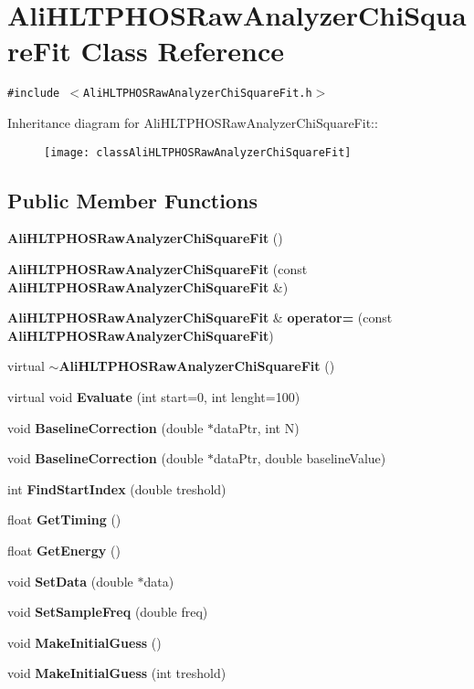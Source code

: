 \section{Ali\-HLTPHOSRaw\-Analyzer\-Chi\-Square\-Fit Class Reference}
\label{classAliHLTPHOSRawAnalyzerChiSquareFit}
{\tt \#include $<$Ali\-HLTPHOSRaw\-Analyzer\-Chi\-Square\-Fit.h$>$}

Inheritance diagram for Ali\-HLTPHOSRaw\-Analyzer\-Chi\-Square\-Fit::\begin{figure}[H]
\begin{center}
\leavevmode
\texttt{[image: classAliHLTPHOSRawAnalyzerChiSquareFit]}
\end{center}
\end{figure}
\subsection*{Public Member Functions}
\begin{CompactItemize}
\item 
{\bf Ali\-HLTPHOSRaw\-Analyzer\-Chi\-Square\-Fit} ()
\item 
{\bf Ali\-HLTPHOSRaw\-Analyzer\-Chi\-Square\-Fit} (const {\bf Ali\-HLTPHOSRaw\-Analyzer\-Chi\-Square\-Fit} \&)
\item 
{\bf Ali\-HLTPHOSRaw\-Analyzer\-Chi\-Square\-Fit} \& {\bf operator=} (const {\bf Ali\-HLTPHOSRaw\-Analyzer\-Chi\-Square\-Fit})
\item 
virtual {\bf $\sim$Ali\-HLTPHOSRaw\-Analyzer\-Chi\-Square\-Fit} ()
\item 
virtual void {\bf Evaluate} (int start=0, int lenght=100)
\item 
void {\bf Baseline\-Correction} (double $\ast$data\-Ptr, int N)
\item 
void {\bf Baseline\-Correction} (double $\ast$data\-Ptr, double baseline\-Value)
\item 
int {\bf Find\-Start\-Index} (double treshold)
\item 
float {\bf Get\-Timing} ()
\item 
float {\bf Get\-Energy} ()
\item 
void {\bf Set\-Data} (double $\ast$data)
\item 
void {\bf Set\-Sample\-Freq} (double freq)
\item 
void {\bf Make\-Initial\-Guess} ()
\item 
void {\bf Make\-Initial\-Guess} (int treshold)
\end{CompactItemize}
